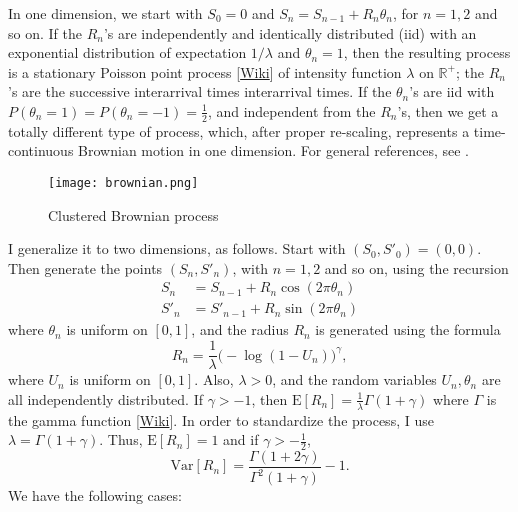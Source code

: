 \documentclass[oneside,10pt]{book}
\begin{document}
  In one dimension, we start with $S_0=0$ and $S_n=S_{n-1}+R_n\theta_n$, for $n=1,2$ and so on. If the $R_n$'s are independently and identically distributed (iid) with an exponential distribution of expectation $1/\lambda$ and $\theta_n=1$, then the resulting process is a stationary 
\textcolor{index}{Poisson point process} [\href{https://en.wikipedia.org/wiki/Poisson_point_process}{Wiki}] of 
intensity function $\lambda$ on $\mathbb{R}^{+}$; the $R_n$'s are the successive 
interarrival times \textcolor{index}{interarrival times}. If the $\theta_n$'s are iid with $P(\theta_n=1)=P(\theta_n=-1)=\frac{1}{2}$, and independent from the $R_n$'s, then we get a totally different type of process, which, after proper re-scaling, represents a time-continuous 
 \textcolor{index}{Brownian motion} in one dimension. For general references, see \cite{daleyA2002,daleyB2008}.


\begin{figure}[H]
\centering
\texttt{[image: brownian.png]}  
\caption{Clustered Brownian process}
\label{fig:lolbrown}
\end{figure}

I generalize it to two dimensions, as follows. Start with $(S_0,S'_0)=(0,0)$. Then generate the points $(S_n, S'_n)$, with $n=1,2$ and so on, using the recursion
\begin{align}
S_n &  =  S_{n-1}+R_n \cos(2\pi\theta_n) \label{brown10} \\
S'_n & = S'_{n-1}+ R_n\sin(2\pi\theta_n) \label{brown11}
\end{align}
where $\theta_n$ is uniform on $[0, 1]$, and the radius $R_n$ is generated using the formula
\begin{equation}
R_n=\frac{1}{\lambda}\Big(-\log(1-U_n)\Big)^\gamma, \label{gam11}
\end{equation}
where $U_n$ is uniform on $[0,1]$. Also, $\lambda>0$, and the random variables $U_n,\theta_n$ are all independently distributed. If $\gamma>-1$, then
$\mbox{E}[R_n]=\frac{1}{\lambda}\Gamma(1+\gamma)$ where $\Gamma$ is the \textcolor{index}{gamma function} 
[\href{https://en.wikipedia.org/wiki/Gamma_function}{Wiki}]. In order to standardize the process, I use
$\lambda=\Gamma(1+\gamma)$. Thus, $\mbox{E}[R_n]=1$ and if $\gamma>-\frac{1}{2}$,
$$\mbox{Var}[R_n]=\frac{\Gamma(1+2\gamma)}{\Gamma^2(1+\gamma)}-1.$$
We have the following cases:
\end{document}
